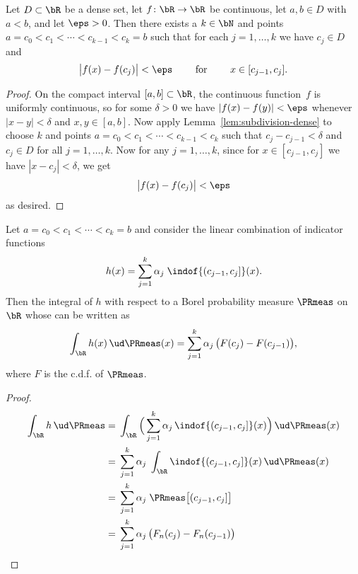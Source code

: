 \begin{lemma}
  \label{lem:continuous-function-approximation-subdivision}
  \leanok
  Let $D \subset \bR$ be a dense set, let $f \colon \bR \to \bR$ be continuous,
  let $a, b \in D$ with $a < b$, and let $\eps > 0$.
  Then there exists a $k \in \bN$ and points
  $a=c_0 < c_1 < \cdots < c_{k-1} < c_k = b$ such that for
  each $j = 1, \ldots, k$ we have $c_j \in D$ and
  \begin{align*}
  \big| f(x) - f(c_j) \big| < \eps
  \qquad \text{ for } \qquad x \in [c_{j-1} , c_j] .
  \end{align*}
\end{lemma}
\begin{proof}
  On the compact interval
  $[a,b] \subset \bR$, the continuous function~$f$ is uniformly continuous, so for some
  $\delta > 0 $ we have $|f(x)-f(y)|<\eps$ whenever $|x-y|<\delta$ and $x,y \in
  [a,b]$.
  Now apply Lemma~\ref{lem:subdivision-dense} to choose $k$ and points
  $a=c_0 < c_1 < \cdots < c_{k-1} < c_k$ such that $c_j - c_{j-1} < \delta$
  and $c_j \in D$ for all $j = 1 , \ldots , k$.
  Now for any $j = 1 , \ldots , k$, since for $x \in [c_{j-1} , c_j]$ we have
  $|x - c_j| < \delta$, we get
  \begin{align*}
  \big| f(x) - f(c_j) \big| < \eps
  \end{align*}
  as desired.
\end{proof}

\begin{lemma}
  \label{lem:simple-integral-cdf-difference}
  \leanok
  Let $a = c_0 < c_1 < \cdots < c_k = b$ and consider the
  linear combination of indicator functions
  \begin{align*}
    h(x) = \sum_{j=1}^k \alpha_j \; \indof{(c_{j-1},c_j]}(x) .
  \end{align*}
  Then the integral of $h$ with respect to a Borel probability measure $\PRmeas$ on $\bR$ whose
  can be written as
  \begin{align*}
    \int_{\bR} h(x) \, \ud \PRmeas (x) = \sum_{j=1}^k \alpha_j \, \big( F(c_j) - F(c_{j-1}) \big) ,
  \end{align*}
  where $F$ is the c.d.f. of $\PRmeas$.
\end{lemma}
\begin{proof}
  \begin{align*}
  \int_{\bR} h \, \ud \PRmeas
   = \; & \int_{\bR}
          \Big( \sum_{j=1}^k \alpha_j \, \indof{(c_{j-1},c_j]}(x) \Big) \, \ud \PRmeas(x) \\
   = \; & \sum_{j=1}^k \alpha_j \; \int_{\bR} \indof{(c_{j-1},c_j]}(x) \, \ud \PRmeas(x) \\
   = \; & \sum_{j=1}^k \alpha_j \; \PRmeas \big[ (c_{j-1},c_j] \big] \\
   = \; & \sum_{j=1}^k \alpha_j \, \big( F_n(c_j) - F_n(c_{j-1}) \big)
  \end{align*}
\end{proof}

